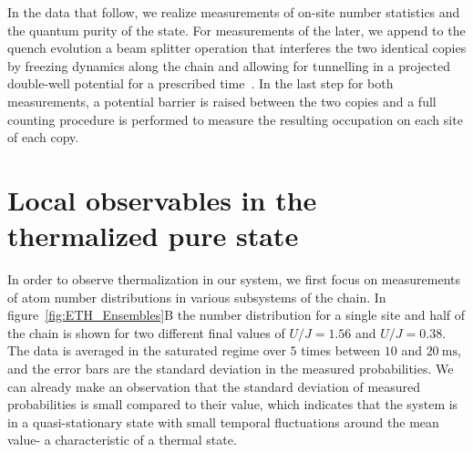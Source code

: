 In the data that follow, we realize measurements of on-site number statistics and the quantum purity of the state. For measurements of the later, we append to the quench evolution a beam splitter operation that interferes the two identical copies by freezing dynamics along the chain and allowing for tunnelling in a projected double-well potential for a prescribed time~\cite{Islam2015}. In the last step for both measurements, a potential barrier is raised between the two copies and a full counting procedure is performed to measure the resulting occupation on each site of each copy.

\section{Local observables in the thermalized pure state}

In order to observe thermalization in our system, we first focus on measurements of atom number distributions in various subsystems of the chain. In figure~\ref{fig:ETH_Ensembles}B the number distribution for a single site and half of the chain is shown for two different final values of $U/J = 1.56$ and $U/J =0.38$. The data is averaged in the saturated regime over $5$ times between $10$ and $20~\mathrm{ms}$, and the error bars are the standard deviation in the measured probabilities. We can already make an observation that the standard deviation of measured probabilities is small compared to their value, which indicates that the system is in a quasi-stationary state with small temporal fluctuations around the mean value- a characteristic of a thermal state.


